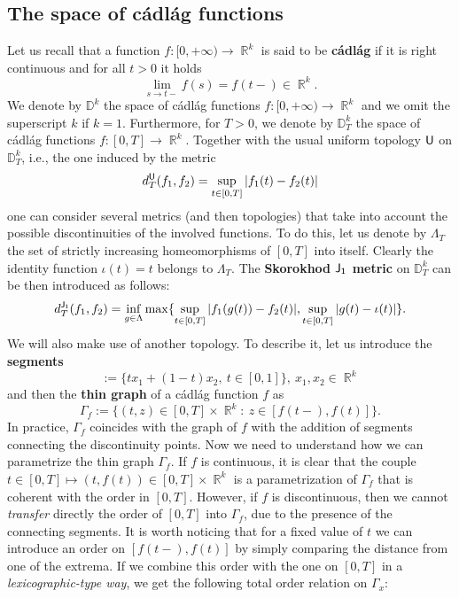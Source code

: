 \documentclass[]{amsart}
\numberwithin{equation}{section}
\theoremstyle{remark}
\theoremstyle{definition}
\DeclareMathOperator{\R}{\mathbb{R}}
\begin{document}
\subsection{The space of c\'adl\'ag functions}
Let us recall that a function $f:[0,+\infty) \to \R^k$ is said to be \textbf{c\'adl\'ag} if it is right continuous and for all $t >0$ it holds
\begin{equation*}
	\lim_{s \to t-}f(s)=f(t-)\in \R^k.
\end{equation*}
We denote by $\mathbb{D}^k$ the space of c\'adl\'ag functions $f:[0,+\infty) \to \R^k$ and we omit the superscript $k$ if $k=1$. Furthermore, for $T>0$, we denote by $\mathbb{D}^k_T$ the space of c\'adl\'ag functions $f:[0,T] \to \R^k$. Together with the usual uniform topology ${\sf U}$ on $\mathbb{D}_T^k$, i.e., the one induced by the metric
\begin{equation*}
	d^{\sf U}_T(f_1,f_2)=\sup_{t \in [0,T]}|f_1(t)-f_2(t)|
\end{equation*} 
one can consider several metrics (and then topologies) that take into account the possible discontinuities of the involved functions. To do this, let us denote by $\Lambda_T$ the set of strictly increasing homeomorphisms of $[0,T]$ into itself. Clearly the identity function $\iota(t)=t$ belongs to $\Lambda_T$. The \textbf{Skorokhod ${\sf J_1}$ metric} on $\mathbb{D}_T^k$ can be then introduced as follows:
\begin{equation*}
	d^{\sf J_1}_T(f_1,f_2)=\inf_{g \in \Lambda}\max\{\sup_{t \in [0,T]}|f_1(g(t))-f_2(t)|, \sup_{t \in [0,T]}|g(t)-\iota(t)|\}.
\end{equation*} 
We will also make use of another topology. To describe it, let us introduce the \textbf{segments}
\begin{equation*}
	[x_1,x_2]:=\{tx_1+(1-t)x_2, \ t \in [0,1]\}, \ x_1,x_2 \in \R^k
\end{equation*}
and then the \textbf{thin graph} of a c\'adl\'ag function $f$ as
\begin{equation*}
	\Gamma_f:=\{(t,z) \in [0,T]\times \R^k: \ z \in [f(t-),f(t)]\}.
\end{equation*}
In practice, $\Gamma_f$ coincides with the graph of $f$ with the addition of segments connecting the discontinuity points. Now we need to understand how we can parametrize the thin graph $\Gamma_f$. If $f$ is continuous, it is clear that the couple $t \in [0,T] \mapsto (t,f(t)) \in [0,T]\times \R^k$ is a parametrization of $\Gamma_f$ that is coherent with the order in $[0,T]$. However, if $f$ is discontinuous, then we cannot \textit{transfer} directly the order of $[0,T]$ into $\Gamma_f$, due to the presence of the connecting segments. It is worth noticing that for a fixed value of $t$ we can introduce an order on $[f(t-),f(t)]$ by simply comparing the distance from one of the extrema. If we combine this order with the one on $[0,T]$ in a \textit{lexicographic-type way}, we get the following total order relation on $\Gamma_x$:
\end{document}
